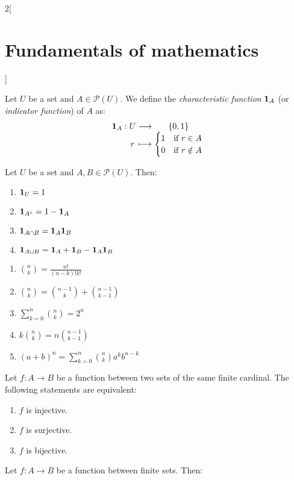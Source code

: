 \documentclass[../../../main.tex]{subfiles}
\begin{document}
\begin{multicols}{2}[\section{Fundamentals of mathematics}]
  \begin{definition}
    Let $U$ be a set and $A\in\mathcal{P}(U)$. We define the \emph{characteristic function} $\boldsymbol{\mathrm{1}}_{A}$ (or \emph{indicator function}) of $A$ as:
    $$
      \function{\indi{A}}{U}{\{0,1\}}{r}{
        \begin{cases}
          1 & \text{if }r\in A    \\
          0 & \text{if }r\notin A
        \end{cases}}
    $$
  \end{definition}
  \begin{proposition}
    Let $U$ be a set and $A,B\in\mathcal{P}(U)$. Then:
    \begin{enumerate}
      \item $\boldsymbol{\mathrm{1}}_{U}=1$
      \item $\boldsymbol{\mathrm{1}}_{A^c}=1-\boldsymbol{\mathrm{1}}_{A}$
      \item $\boldsymbol{\mathrm{1}}_{A\cap B}=\boldsymbol{\mathrm{1}}_{A}\boldsymbol{\mathrm{1}}_{B}$
      \item $\boldsymbol{\mathrm{1}}_{A\cup B}=\boldsymbol{\mathrm{1}}_{A}+\boldsymbol{\mathrm{1}}_{B}-\boldsymbol{\mathrm{1}}_{A}\boldsymbol{\mathrm{1}}_{B}$
    \end{enumerate}
  \end{proposition}
  \begin{proposition}\hfill
    \begin{enumerate}
      \item $\binom{n}{k}=\frac{n!}{(n-k)!k!}$
      \item $\binom{n}{k}=\binom{n-1}{k}+\binom{n-1}{k-1}$
      \item $\sum_{k=0}^n\binom{n}{k}=2^n$
      \item $k\binom{n}{k}=n\binom{n-1}{k-1}$
      \item $(a+b)^n=\sum_{k=0}^n\binom{n}{k}a^kb^{n-k}$
    \end{enumerate}
  \end{proposition}
  \begin{proposition}
    Let $f:A\rightarrow B$ be a function between two sets of the same finite cardinal. The following statements are equivalent:
    \begin{enumerate}
      \item $f$ is injective.
      \item $f$ is surjective.
      \item $f$ is bijective.
    \end{enumerate}
  \end{proposition}
  \begin{corollary}
    Let $f:A\rightarrow B$ be a function between finite sets. Then:

\end{corollary}
\end{multicols}
\end{document}
